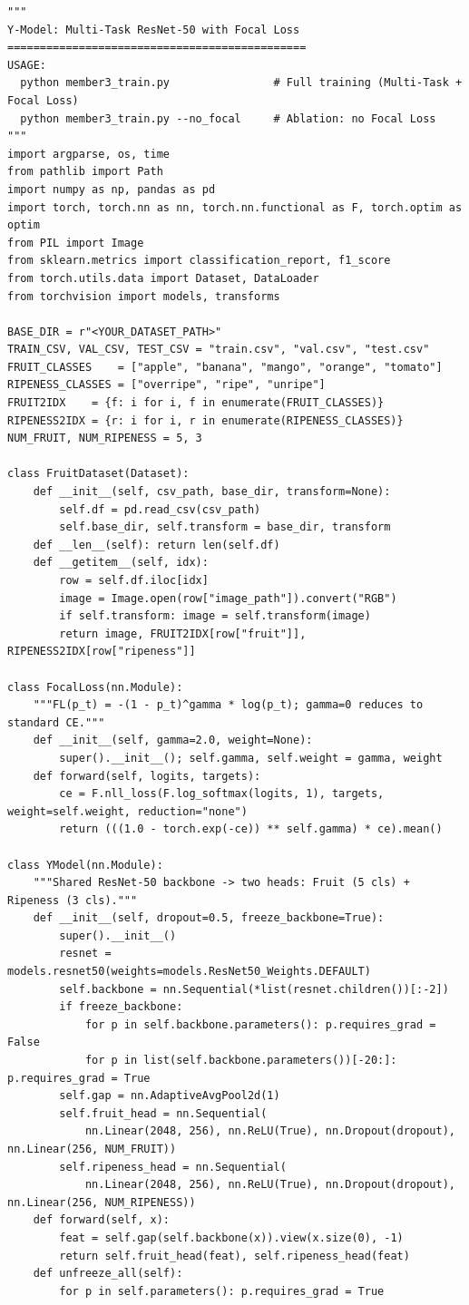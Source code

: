 \documentclass[10pt,twocolumn,letterpaper]{article}
\begin{document}
{\small
\begin{verbatim}
"""
Y-Model: Multi-Task ResNet-50 with Focal Loss
==============================================
USAGE:
  python member3_train.py                # Full training (Multi-Task + Focal Loss)
  python member3_train.py --no_focal     # Ablation: no Focal Loss
"""
import argparse, os, time
from pathlib import Path
import numpy as np, pandas as pd
import torch, torch.nn as nn, torch.nn.functional as F, torch.optim as optim
from PIL import Image
from sklearn.metrics import classification_report, f1_score
from torch.utils.data import Dataset, DataLoader
from torchvision import models, transforms

BASE_DIR = r"<YOUR_DATASET_PATH>"
TRAIN_CSV, VAL_CSV, TEST_CSV = "train.csv", "val.csv", "test.csv"
FRUIT_CLASSES    = ["apple", "banana", "mango", "orange", "tomato"]
RIPENESS_CLASSES = ["overripe", "ripe", "unripe"]
FRUIT2IDX    = {f: i for i, f in enumerate(FRUIT_CLASSES)}
RIPENESS2IDX = {r: i for i, r in enumerate(RIPENESS_CLASSES)}
NUM_FRUIT, NUM_RIPENESS = 5, 3

class FruitDataset(Dataset):
    def __init__(self, csv_path, base_dir, transform=None):
        self.df = pd.read_csv(csv_path)
        self.base_dir, self.transform = base_dir, transform
    def __len__(self): return len(self.df)
    def __getitem__(self, idx):
        row = self.df.iloc[idx]
        image = Image.open(row["image_path"]).convert("RGB")
        if self.transform: image = self.transform(image)
        return image, FRUIT2IDX[row["fruit"]], RIPENESS2IDX[row["ripeness"]]

class FocalLoss(nn.Module):
    """FL(p_t) = -(1 - p_t)^gamma * log(p_t); gamma=0 reduces to standard CE."""
    def __init__(self, gamma=2.0, weight=None):
        super().__init__(); self.gamma, self.weight = gamma, weight
    def forward(self, logits, targets):
        ce = F.nll_loss(F.log_softmax(logits, 1), targets, weight=self.weight, reduction="none")
        return (((1.0 - torch.exp(-ce)) ** self.gamma) * ce).mean()

class YModel(nn.Module):
    """Shared ResNet-50 backbone -> two heads: Fruit (5 cls) + Ripeness (3 cls)."""
    def __init__(self, dropout=0.5, freeze_backbone=True):
        super().__init__()
        resnet = models.resnet50(weights=models.ResNet50_Weights.DEFAULT)
        self.backbone = nn.Sequential(*list(resnet.children())[:-2])
        if freeze_backbone:
            for p in self.backbone.parameters(): p.requires_grad = False
            for p in list(self.backbone.parameters())[-20:]: p.requires_grad = True
        self.gap = nn.AdaptiveAvgPool2d(1)
        self.fruit_head = nn.Sequential(
            nn.Linear(2048, 256), nn.ReLU(True), nn.Dropout(dropout), nn.Linear(256, NUM_FRUIT))
        self.ripeness_head = nn.Sequential(
            nn.Linear(2048, 256), nn.ReLU(True), nn.Dropout(dropout), nn.Linear(256, NUM_RIPENESS))
    def forward(self, x):
        feat = self.gap(self.backbone(x)).view(x.size(0), -1)
        return self.fruit_head(feat), self.ripeness_head(feat)
    def unfreeze_all(self):
        for p in self.parameters(): p.requires_grad = True


\end{verbatim}}
\end{document}
